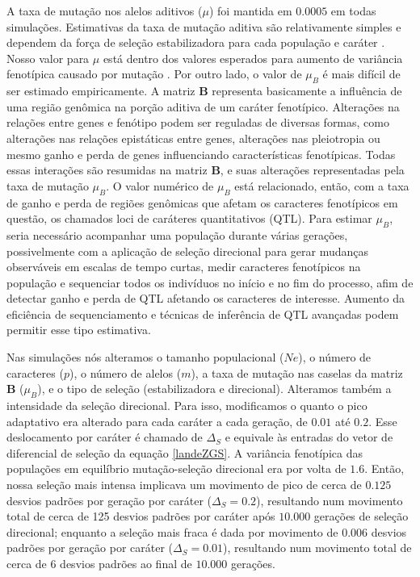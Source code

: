 A taxa de mutação nos alelos aditivos ($\mu$) foi mantida em $0.0005$ em
todas simulações.
Estimativas da taxa de mutação aditiva são relativamente
simples e dependem da força de seleção estabilizadora para cada
população e caráter \citep{Lynch1998}.
Nosso valor para $\mu$ está dentro dos valores esperados para aumento de
variância fenotípica causado por mutação \citep{Burger1994}.
Por outro lado, o valor de $\mu_B$ é mais difícil de ser estimado empiricamente.
A matriz $\mathbf{B}$ representa basicamente a influência de uma região
genômica na porção aditiva de um caráter fenotípico.
Alterações na relações entre genes e fenótipo podem ser reguladas de
diversas formas, como alterações nas relações epistáticas entre genes,
alterações nas pleiotropia ou mesmo ganho e perda de genes influenciando
características fenotípicas.
Todas essas interações são resumidas na matriz $\mathbf{B}$, e suas
alterações representadas pela taxa de mutação $\mu_B$.
O valor numérico de $\mu_B$ está relacionado, então, com a taxa de ganho
e perda de regiões genômicas que afetam os caracteres fenotípicos em
questão, os chamados loci de caráteres quantitativos (QTL).
Para estimar $\mu_B$, seria necessário acompanhar uma população durante
várias gerações, possivelmente com a aplicação de seleção direcional
para gerar mudanças observáveis em escalas de tempo curtas, medir
caracteres fenotípicos na população e sequenciar todos os indivíduos no
início e no fim do processo, afim de detectar ganho e perda de QTL
afetando os caracteres de interesse.
Aumento da eficiência de sequenciamento e técnicas de inferência de QTL
avançadas podem permitir esse tipo estimativa.

Nas simulações nós alteramos o tamanho populacional ($Ne$), o número de
caracteres ($p$), o número de alelos ($m$), a taxa de mutação nas caselas da
matriz $\mathbf{B}$ ($\mu_B$), e o tipo de seleção (estabilizadora e direcional).
Alteramos também a intensidade da seleção direcional.
Para isso, modificamos o quanto o pico adaptativo era alterado para cada
caráter a cada geração, de $0.01$ até $0.2$.
Esse deslocamento por caráter é chamado de $\Delta_S$ e equivale às
entradas do vetor de diferencial de seleção da equação \ref{landeZGS}.
A variância fenotípica das populações em equilíbrio mutação-seleção
direcional era por volta de $1.6$.
Então, nossa seleção mais intensa implicava um movimento de pico de
cerca de $0.125$ desvios padrões por geração por caráter ($\Delta_S=0.2$),
resultando num movimento total de cerca de 125 desvios padrões por caráter
após $10.000$ gerações de seleção direcional; enquanto a seleção mais
fraca é dada por movimento de $0.006$ desvios padrões por geração por caráter
($\Delta_S=0.01$), resultando num movimento total de cerca de 6 desvios
padrões ao final de $10.000$ gerações.

